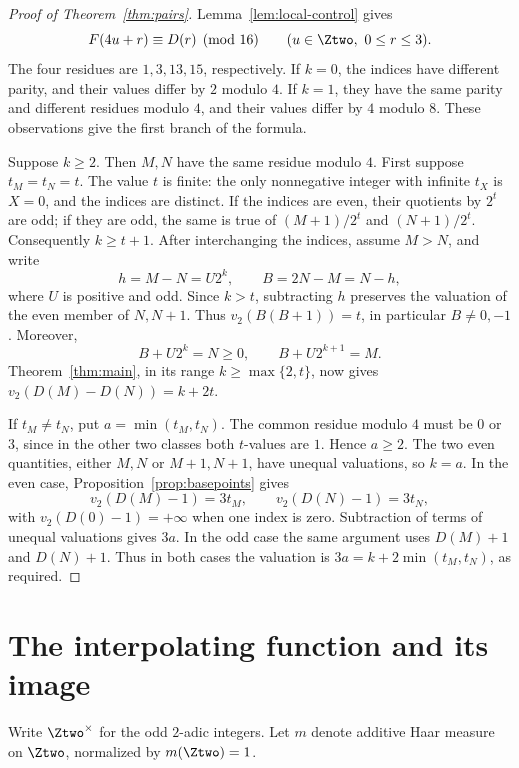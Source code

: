 \begin{proof}[Proof of Theorem~\ref{thm:pairs}]
Lemma~\ref{lem:local-control} gives
\[
 F(4u+r)\equiv D(r)\pmod{16}
 \qquad(u\in\Ztwo,\ 0\le r\le3).
\]
The four residues are $1,3,13,15$, respectively. If $k=0$, the
indices have different parity, and their values differ by $2$ modulo
$4$. If $k=1$, they have the same parity and different residues modulo
$4$, and their values differ by $4$ modulo $8$. These observations give
the first branch of the formula.

Suppose $k\ge2$. Then $M,N$ have the same residue modulo $4$.
First suppose $t_M=t_N=t$. The value $t$ is finite: the only
nonnegative integer with infinite $t_X$ is $X=0$, and the indices are
distinct. If the indices are even, their quotients by $2^t$ are odd;
if they are odd, the same is true of $(M+1)/2^t$ and $(N+1)/2^t$.
Consequently $k\ge t+1$. After interchanging the indices, assume
$M>N$, and write
\[
 h=M-N=U2^k,\qquad B=2N-M=N-h,
\]
where $U$ is positive and odd. Since $k>t$, subtracting $h$ preserves
the valuation of the even member of $N,N+1$. Thus
$v_2(B(B+1))=t$, in particular $B\ne0,-1$. Moreover,
\[
 B+U2^k=N\ge0,\qquad B+U2^{k+1}=M.
\]
Theorem~\ref{thm:main}, in its range $k\ge\max\{2,t\}$, now gives
$v_2(D(M)-D(N))=k+2t$.

If $t_M\ne t_N$, put $a=\min(t_M,t_N)$. The common residue modulo
$4$ must be $0$ or $3$, since in the other two classes both $t$-values
are $1$. Hence $a\ge2$. The two even quantities, either $M,N$ or
$M+1,N+1$, have unequal valuations, so $k=a$. In the even case,
Proposition~\ref{prop:basepoints} gives
\[
 v_2(D(M)-1)=3t_M,\qquad v_2(D(N)-1)=3t_N,
\]
with $v_2(D(0)-1)=+\infty$ when one index is zero. Subtraction of
terms of unequal valuations gives $3a$. In the odd case the same
argument uses $D(M)+1$ and $D(N)+1$. Thus in both cases the valuation
is $3a=k+2\min(t_M,t_N)$, as required.
\end{proof}

\section{The interpolating function and its image}\label{sec:image}
Write $\Ztwo^\times$ for the odd $2$-adic integers. Let $m$ denote
additive Haar measure on $\Ztwo$, normalized by $m(\Ztwo)=1$.

